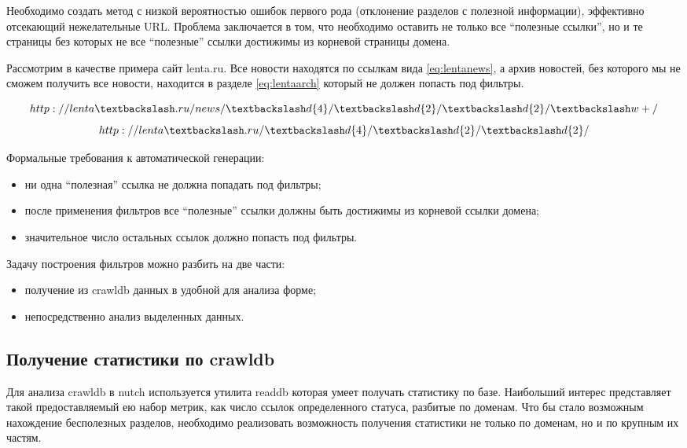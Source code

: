 Необходимо создать метод с низкой вероятностью ошибок первого рода (отклонение разделов с полезной информации), эффективно отсекающий нежелательные URL. Проблема заключается в том, что необходимо оставить не только все ``полезные ссылки'', но и те страницы без которых не все ``полезные'' ссылки достижимы из корневой страницы домена. 

Рассмотрим в качестве примера сайт lenta.ru. Все новости находятся по ссылкам вида \ref{eq:lentanews}, а архив новостей, без которого мы не сможем получить все новости, находится в разделе \ref{eq:lentaarch} который не должен попасть под фильтры.

\begin{equation}\label{eq:lentanews}
http://lenta\textbackslash.ru/news/\textbackslash d\{4\}/\textbackslash d\{2\}/\textbackslash d\{2\}/\textbackslash w+/
\end{equation}
\begin{equation}\label{eq:lentaarch}
 http://lenta\textbackslash.ru/\textbackslash d\{4\}/\textbackslash d\{2\}/\textbackslash d\{2\}/ 
\end{equation}

Формальные требования к автоматической генерации:
\begin{itemize}
 \item ни одна ``полезная'' ссылка  не должна попадать под фильтры;
 \item после применения фильтров все ``полезные'' ссылки должны быть достижимы из корневой ссылки домена;
 \item значительное число остальных ссылок должно попасть под фильтры.
\end{itemize}

Задачу построения фильтров можно разбить на две части:
\begin{itemize}
 \item получение из crawldb данных в удобной для анализа форме;
 \item непосредственно анализ выделенных данных.
\end{itemize}

\subsection{Получение статистики по crawldb}
Для анализа crawldb в nutch используется утилита readdb которая умеет получать статистику по базе. Наибольший интерес представляет такой предоставляемый ею набор метрик, как число ссылок определенного статуса, разбитые по доменам. Что бы стало возможным нахождение бесполезных разделов, необходимо реализовать возможность получения статистики не только по доменам, но и по крупным их частям.

